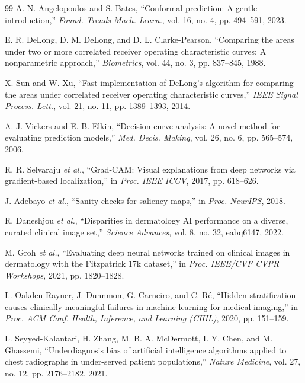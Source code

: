 \documentclass[journal]{IEEEtran}
\begin{document}
\begin{thebibliography}{99}
 A. N. Angelopoulos and S. Bates, ``Conformal prediction: A
gentle introduction,'' \emph{Found. Trends Mach. Learn.}, vol. 16, no. 4, pp. 494--591, 2023.

 E. R. DeLong, D. M. DeLong, and D. L. Clarke-Pearson, ``Comparing the
areas under two or more correlated receiver operating characteristic curves: A nonparametric
approach,'' \emph{Biometrics}, vol. 44, no. 3, pp. 837--845, 1988.

 X. Sun and W. Xu, ``Fast implementation of DeLong's algorithm for
comparing the areas under correlated receiver operating characteristic curves,'' \emph{IEEE
Signal Process. Lett.}, vol. 21, no. 11, pp. 1389--1393, 2014.

 A. J. Vickers and E. B. Elkin, ``Decision curve analysis: A novel
method for evaluating prediction models,'' \emph{Med. Decis. Making}, vol. 26, no. 6, pp.
565--574, 2006.

 R. R. Selvaraju \emph{et al.}, ``Grad-CAM: Visual explanations
from deep networks via gradient-based localization,'' in \emph{Proc. IEEE ICCV}, 2017, pp.
618--626.

 J. Adebayo \emph{et al.}, ``Sanity checks for saliency maps,'' in
\emph{Proc. NeurIPS}, 2018.

 R. Daneshjou \emph{et al.}, ``Disparities in dermatology
AI performance on a diverse, curated clinical image set,'' \emph{Science Advances}, vol. 8,
no. 32, eabq6147, 2022.

 M. Groh \emph{et al.}, ``Evaluating deep neural networks
trained on clinical images in dermatology with the Fitzpatrick 17k dataset,'' in \emph{Proc.
IEEE/CVF CVPR Workshops}, 2021, pp. 1820--1828.

 L. Oakden-Rayner, J. Dunnmon, G. Carneiro, and C. R\'{e},
``Hidden stratification causes clinically meaningful failures in machine learning for medical
imaging,'' in \emph{Proc. ACM Conf. Health, Inference, and Learning (CHIL)}, 2020, pp.
151--159.

 L. Seyyed-Kalantari, H. Zhang, M. B. A.
McDermott, I. Y. Chen, and M. Ghassemi, ``Underdiagnosis bias of artificial intelligence
algorithms applied to chest radiographs in under-served patient populations,'' \emph{Nature
Medicine}, vol. 27, no. 12, pp. 2176--2182, 2021.


\end{thebibliography}
\end{document}
